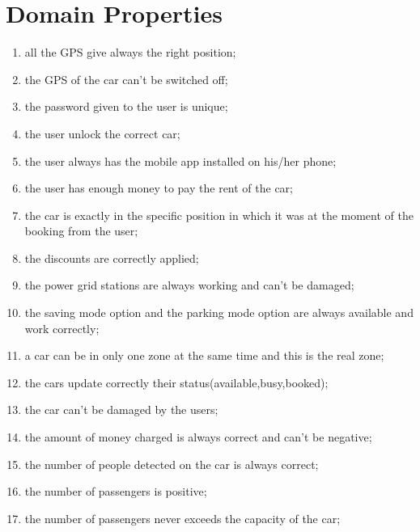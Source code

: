 \section{Domain Properties}
\begin{enumerate}
	\item all the GPS give always the right position;
	\item the GPS of the car can't be switched off;
	\item the password given to the user is unique;
	\item the user unlock the correct car;
	\item the user always has the mobile app installed on his/her phone;
	\item the user has enough money to pay the rent of the car;
	\item the car is exactly in the specific position in which it was at the moment of the booking from the user;
	\item the discounts are correctly applied;
	\item the power grid stations are always working and can't be damaged;
	\item the saving mode option and the parking mode option are always available and work correctly;
	\item a car can be in only one zone at the same time and this is the real zone;
	\item the cars update correctly their status(available,busy,booked);
    \item the car can't be damaged by the users;
    \item the amount of money charged is always correct and can't be negative;
    \item the number of people detected on the car is always correct;
    \item the number of passengers is positive;
    \item the number of passengers never exceeds the capacity of the car;

    
  
   
    
\end{enumerate}
